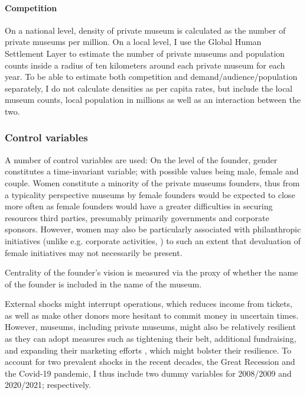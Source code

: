\documentclass[12pt]{article}
\begin{document}
\paragraph*{Competition}

On a national level, density of private museum is calculated as the number of private museums per million.
On a local level, I use the Global Human Settlement Layer \parencite{EC_2023_GHSL} to estimate the number of private museums and population counts inside a radius of ten kilometers around each private museum for each year.
To be able to estimate both competition and demand/audience/population separately, I do not calculate densities as per capita rates, but include the local museum counts, local population in millions as well as an interaction between the two.
\subsubsection*{Control variables}


\bigbreak
\noindent
A number of control variables are used: 
On the level of the founder, gender constitutes a time-invariant variable; with possible values being male, female and couple.
Women constitute a minority of the private museums founders, thus from a typicality perspective \parencite{Rosch_1975_family} museums by female founders would be expected to close more often as female founders would have a greater difficulties in securing resources third parties, presumably primarily governments and corporate sponsors.
However, women may also be particularly associated with philanthropic initiatives (unlike e.g. corporate activities, \cite{Milam_2013_artgirls}) to such an extent that devaluation of female initiatives may not necessarily be present.

Centrality of the founder's vision is measured via the proxy of whether the name of the founder is included in the name of the museum.




External shocks might interrupt operations, which reduces income from tickets, as well as make other donors more hesitant to commit money in uncertain times.
However, museums, including private museums, might also be relatively resilient as they can adopt measures such as tightening their belt, additional fundraising, and expanding their marketing efforts \parencite{Geller_Salamon_2010_resilience}, which might bolster their resilience.
To account for two prevalent shocks in the recent decades, the Great Recession and the Covid-19 pandemic, I thus include two dummy variables for 2008/2009 and 2020/2021; respectively.
\end{document}
